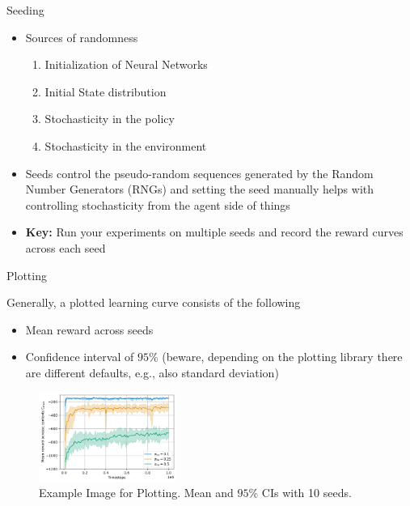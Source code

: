 \documentclass[aspectratio=169]{../latex_main/tntbeamer}  %
\begin{document}
\begin{frame}[c]{Seeding}

    \begin{itemize}
        \item  Sources of randomness
            \begin{enumerate}
                \item Initialization of Neural Networks
                \item Initial State distribution
                \item Stochasticity in the policy
                \item Stochasticity in the environment
            \end{enumerate}
        \vfill
        \item  Seeds control the pseudo-random sequences generated by the Random Number Generators (RNGs) and setting the seed manually helps with controlling stochasticity from the agent side of things
        \vfill
        \item  \textbf{Key:} Run your experiments on multiple seeds and record the reward curves across each seed
    \end{itemize}

   
        
\end{frame}


\begin{frame}[c]{Plotting}

    \small{
    Generally, a plotted learning curve consists of the following
    \begin{itemize}
         \item Mean reward across seeds
        \item Confidence interval of $95\%$ \tiny{(beware, depending on the plotting library there are different defaults, e.g., also standard deviation)}
        
    \end{itemize}
    }

    \hfill
   
    \begin{figure}
        \centering
        \includegraphics[width=0.4\textwidth]{images/Example_Image.png}
        \caption{Example Image for Plotting. Mean and $95\%$ CIs with 10 seeds.}
        \label{fig:my_label}
    \end{figure}

    
\end{frame}
\end{document}

